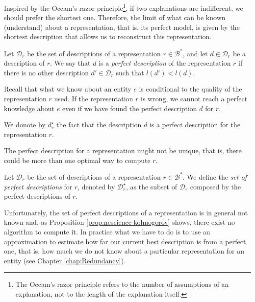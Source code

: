 Inspired by the Occam's razor principle\footnote{The Occam's razor principle refers to the number of assumptions of an explanation, not to the length of the explanation itself.}, if two explanations are indifferent, we should prefer the shortest one. Therefore, the limit of what can be known (understand) about a representation, that is, its perfect model, is given by the shortest description that allows us to reconstruct this representation.

\begin{definition}
\label{def:descriptions_perfect_model}
Let $\mathcal{D}_r$ be the set of descriptions of a representation $r \in \mathcal{B}^\ast$, and let $d \in \mathcal{D}_r$ be a description of $r$. We say that $d$ is a \emph{perfect description} of the representation $r$ if there is no other description $d' \in\mathcal{D}_r$ such that $l(d') < l(d)$.
\end{definition}

Recall that what we know about an entity $e$ is conditional to the quality of the representation $r$ used. If the representation $r$ is wrong, we cannot reach a perfect knowledge about $e$ even if we have found the perfect description $d$ for $r$.

\begin{notation}
We donote by $d_r^{\star}$ the fact that the description $d$ is a perfect description for the representation $r$.
\end{notation}

The perfect description for a representation might not be unique, that is, there could be more than one optimal way to compute $r$.

\begin{definition}
\label{def:set_descriptions_perfect_model}
Let $\mathcal{D}_r$ be the set of descriptions of a representation $r \in \mathcal{B}^\ast$. We define the \emph{set of perfect descriptions} for $r$, denoted by $\mathcal{D}^\star_r$, as the subset of $\mathcal{D}_r$ composed by the perfect descriptions of $r$.
\end{definition}

Unfortunately, the set of perfect descriptions of a representation is in general not known and, as Proposition \ref{prop:nescience-kolmogorov} shows, there exist no algorithm to compute it. In practice what we have to do is to use an approximation to estimate how far our current best description is from a perfect one, that is, how much we do not know about a particular representation for an entity (see Chapter \ref{chap:Redundancy}).

